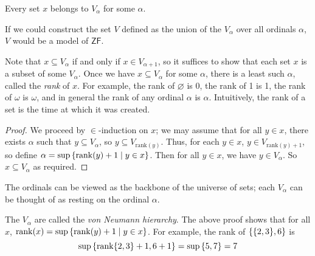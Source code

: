 \begin{theorem}
    Every set \( x \) belongs to \( V_\alpha \) for some \( \alpha \).
\end{theorem}
If we could construct the set \( V \) defined as the union of the \( V_\alpha \) over all ordinals \( \alpha \), \( V \) would be a model of \( \mathsf{ZF} \).
\begin{remark}
    Note that \( x \subseteq V_\alpha \) if and only if \( x \in V_{\alpha+1} \), so it suffices to show that each set \( x \) is a subset of some \( V_\alpha \).
    Once we have \( x \subseteq V_\alpha \) for some \( \alpha \), there is a least such \( \alpha \), called the \emph{rank} of \( x \).
    For example, the rank of \( \varnothing \) is 0, the rank of 1 is 1, the rank of \( \omega \) is \( \omega \), and in general the rank of any ordinal \( \alpha \) is \( \alpha \).
    Intuitively, the rank of a set is the time at which it was created.
\end{remark}
\begin{proof}
    We proceed by \( \in \)-induction on \( x \); we may assume that for all \( y \in x \), there exists \( \alpha \) such that \( y \subseteq V_\alpha \), so \( y \subseteq V_{\mathrm{rank}(y)} \).
    Thus, for each \( y \in x \), \( y \in V_{\mathrm{rank}(y)+1} \), so define \( \alpha = \sup\qty{\mathrm{rank}(y) + 1 \mid y \in x} \).
    Then for all \( y \in x \), we have \( y \in V_\alpha \).
    So \( x \subseteq V_\alpha \) as required.
\end{proof}
The ordinals can be viewed as the backbone of the universe of sets; each \( V_\alpha \) can be thought of as resting on the ordinal \( \alpha \).
\begin{remark}
    The \( V_\alpha \) are called the \emph{von Neumann hierarchy}.
    The above proof shows that for all \( x \), \( \mathrm{rank}(x) = \sup\qty{\mathrm{rank}(y) + 1 \mid y \in x} \).
    For example, the rank of \( \qty{\qty{2, 3}, 6} \) is
    \[ \sup\qty{\mathrm{rank}\qty{2, 3} + 1, 6 + 1} = \sup\qty{5, 7} = 7 \]
\end{remark}
